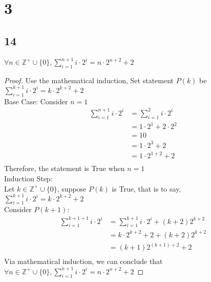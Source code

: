 \documentclass{article}
\begin{document}
\section{3}
\subsection{14}
$\forall n \in \mathbb{Z^+} \cup \{0\}, \sum_{i=1}^{n+1} i \cdot 2^i = n \cdot 2^{n+2} + 2$
\begin{proof}
Use the mathematical induction, Set statement $P(k)$ be $\sum_{i=1}^{k+1} i \cdot 2^i = k \cdot 2^{k+2} + 2$\\
Base Case: Consider $n = 1$\\
\begin{align*}
    \sum_{i=1}^{n+1} i \cdot 2^i &= \sum_{i = 1}^2 i \cdot 2^i \tag{By substitution}\\
    &=1 \cdot 2^1 + 2 \cdot 2^2\\
    &= 10\\
    &= 1 \cdot 2^3 + 2\\
    &= 1 \cdot 2^{1+2} + 2\\
\end{align*}
Therefore, the statement is True when $n  =1 $\\
Induction Step:\\
Let $k \in \mathbb{Z^+} \cup \{0\}$, suppose $P(k)$ is True, that is to say, $\sum_{i=1}^{k+1} i \cdot 2^i = k \cdot 2^{k+2} + 2$\\
Consider $P(k + 1)$:\\
\begin{align*}
    \sum_{i=1}^{k+1+1} i \cdot2^i &= \sum_{i = 1} ^ {k+1} i\cdot2^i + (k+2)2^{k+2} \tag{By algebra}\\
    &= k \cdot 2^{k+2} + 2 + (k+2)2^{k+2} \tag{By substitution}\\
    &= (k+1)2^{(k+1)+2} +2 \tag{By algebra}\\
\end{align*}
Via mathematical induction, we can conclude that $\forall n \in \mathbb{Z^+} \cup \{0\}, \sum_{i=1}^{n+1} i \cdot 2^i = n \cdot 2^{n+2} + 2$
\end{proof}
\end{document}
